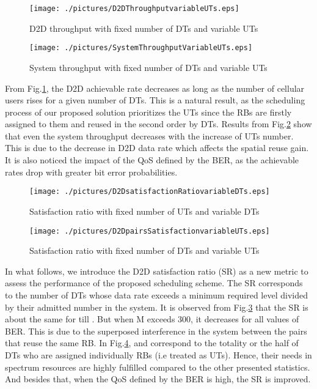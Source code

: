 \documentclass[conference,onecolumn,12pt]{IEEEtran}
\begin{document}
\begin{figure}
\centering
\texttt{[image: ./pictures/D2DThroughputvariableUTs.eps]}
\caption{D2D throughput with fixed number of DTs and variable UTs  }\label{D2DThroughputvariableUTs}
\end{figure}
\begin{figure}
\centering
\texttt{[image: ./pictures/SystemThroughputVariableUTs.eps]}
\caption{System throughput with fixed number of DTs and variable UTs }\label{SystemThroughputVariableUTs}
\end{figure}
From Fig.\ref{D2DThroughputvariableUTs}, the D2D achievable rate decreases as long as the number of cellular users rises for a given number of DTs. This is a natural result, as the scheduling process of our proposed solution prioritizes the UTs since the RBs are firstly assigned to them and reused in the second order by DTs. Results from Fig.\ref{SystemThroughputVariableUTs} show that even the system throughput decreases with the increase of UTs number. This is due to the decrease in D2D data rate which affects the spatial reuse gain. It is also noticed the impact of the QoS defined by the BER, as the achievable rates drop with greater bit error probabilities.\\
\begin{figure}
\centering
\texttt{[image: ./pictures/D2DsatisfactionRatiovariableDTs.eps]}
\caption{Satisfaction ratio with fixed number of UTs and variable DTs }\label{D2DsatisfactionRatiovariableDTs}
\end{figure}
\begin{figure}
\centering
\texttt{[image: ./pictures/D2DpairsSatisfactionvariableUTs.eps]}
\caption{Satisfaction ratio with fixed number of DTs and variable UTs }\label{D2DpairsSatisfactionvariableUTs}
\end{figure}
In what follows, we introduce the D2D satisfaction ratio (SR) as a new metric to assess the performance of the proposed scheduling scheme. The SR corresponds to the number of DTs whose data rate exceeds a minimum required level divided by their admitted number in the system. It is observed from Fig.\ref{D2DsatisfactionRatiovariableDTs} that the SR is about the same for  till . But when M exceeds 300, it decreases for all values of BER. This is due to the superposed interference in the system between the pairs that reuse the same RB. In Fig.\ref{D2DpairsSatisfactionvariableUTs},  and  correspond to the totality or the half of DTs who are assigned individually RBs (i.e treated as UTs). Hence, their needs in spectrum resources are highly fulfilled compared to the other presented statistics. And besides that, when the QoS defined by the BER is high, the SR is improved.
\end{document}
